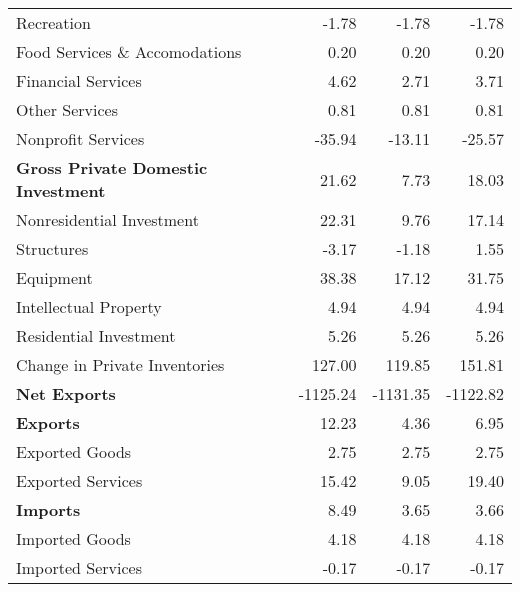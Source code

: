 \documentclass[11pt, letterpaper]{article}\usepackage[]{graphicx}\usepackage[]{color}
\begin{document}
\begin{table}[H]
\begin{tabular}{lrrr}
  \hspace{16mm}  Recreation & -1.78 & -1.78 & -1.78 \\ 
  \hspace{16mm}  Food Services \& Accomodations & 0.20 & 0.20 & 0.20 \\ 
  \hspace{16mm}  Financial Services & 4.62 & 2.71 & 3.71 \\ 
  \hspace{16mm}  Other Services & 0.81 & 0.81 & 0.81 \\ 
  \hspace{16mm}  Nonprofit Services & -35.94 & -13.11 & -25.57 \\ 
  \hspace{0mm} \textbf{Gross Private Domestic Investment} & 21.62 & 7.73 & 18.03 \\ 
  \hspace{8mm}  Nonresidential Investment & 22.31 & 9.76 & 17.14 \\ 
  \hspace{16mm}  Structures & -3.17 & -1.18 & 1.55 \\ 
  \hspace{16mm}  Equipment & 38.38 & 17.12 & 31.75 \\ 
  \hspace{16mm}  Intellectual Property & 4.94 & 4.94 & 4.94 \\ 
  \hspace{8mm}  Residential Investment & 5.26 & 5.26 & 5.26 \\ 
  \hspace{8mm}  Change in Private Inventories & 127.00 & 119.85 & 151.81 \\ 
  \hspace{0mm} \textbf{Net Exports} & -1125.24 & -1131.35 & -1122.82 \\ 
  \hspace{0mm} \textbf{Exports} & 12.23 & 4.36 & 6.95 \\ 
  \hspace{8mm}  Exported Goods & 2.75 & 2.75 & 2.75 \\ 
  \hspace{8mm}  Exported Services & 15.42 & 9.05 & 19.40 \\ 
  \hspace{0mm} \textbf{Imports} & 8.49 & 3.65 & 3.66 \\ 
  \hspace{8mm}  Imported Goods & 4.18 & 4.18 & 4.18 \\ 
  \hspace{8mm}  Imported Services & -0.17 & -0.17 & -0.17 \\ 

\end{tabular}
\end{table}
\end{document}
